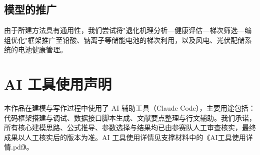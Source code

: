\documentclass[withoutpreface]{cumcmthesis}
\begin{document}
\subsection{模型的推广}
由于所建方法具有通用性，我们尝试将"退化机理分析—健康评估—梯次筛选—编组优化"框架推广至铅酸、钠离子等储能电池的梯次利用，以及风电、光伏配储系统的电池健康管理。

\section{AI 工具使用声明}
本作品在建模与写作过程中使用了 AI 辅助工具（Claude Code），主要用途包括：代码框架搭建与调试、数据接口脚本生成、文献要点整理与行文辅助。我们承诺，所有核心建模思路、公式推导、参数选择与结果均已由参赛队人工审查核实，最终成果以人工核实后的版本为准。AI 工具使用详情见支撑材料中的《AI工具使用详情.pdf》。

\nocite{*}


\end{document}

